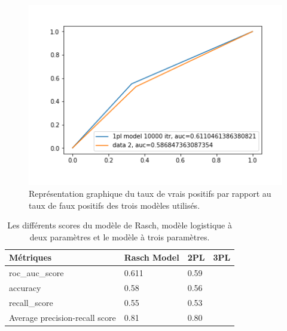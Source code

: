 

\begin{figure}[H]
	\begin{center}
		\includegraphics[scale=0.6]{images/chapitre7/roc_auc.png}
	\end{center}
	\caption{Représentation graphique du taux de vrais positifs par rapport au taux de faux positifs des trois modèles utilisés.}
	\label{roc_auc}
\end{figure}

\begin{table}[H]
	\centering
	\begin{tabular}{|m{3cm}|m{3cm}|m{3cm}|m{3cm}|}
	\hline
	\rowcolor{blueforest}
	\color{white} \textbf{Métriques} & \color{white} \textbf{Rasch Model} & \color{white} \textbf{2PL} & \color{white} \textbf{3PL} \\
	\hline\hline
	roc\_auc\_score & 0.611 & 0.59 & \\ \hline
	accuracy & 0.58 & 0.56 & \\ \hline
	recall\_score & 0.55 & 0.53 & \\ \hline
	Average precision-recall score & 0.81 & 0.80 & \\ \hline
	\end{tabular}
	\caption{Les différents scores du modèle de Rasch, modèle logistique à deux paramètres et le modèle à trois paramètres.}
\end{table}

